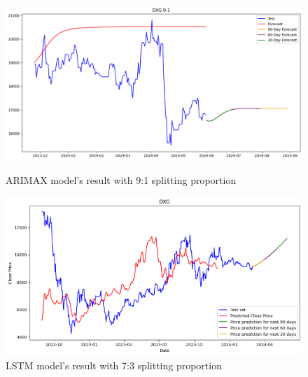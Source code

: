 \documentclass{ieeeojies}
\begin{document}
\begin{figure}[H]
  \centering
  \begin{minipage}{0.23\textwidth}
  \centering
  \includegraphics[width=1\textwidth]{bibliography/Figure/ARIMAX_DXG(9-1).png}
  \caption{ARIMAX model's result with 9:1 splitting proportion}
  \label{fig:1}
  \end{minipage}
  \hfill
  \begin{minipage}{0.23\textwidth}
  \centering
  \includegraphics[width=1\textwidth]{bibliography/Figure/DXG_LSTM(7-3).png}
  \caption{LSTM model's result with 7:3 splitting proportion}
  \label{fig:2}
  \end{minipage}
\end{figure}
\end{document}
